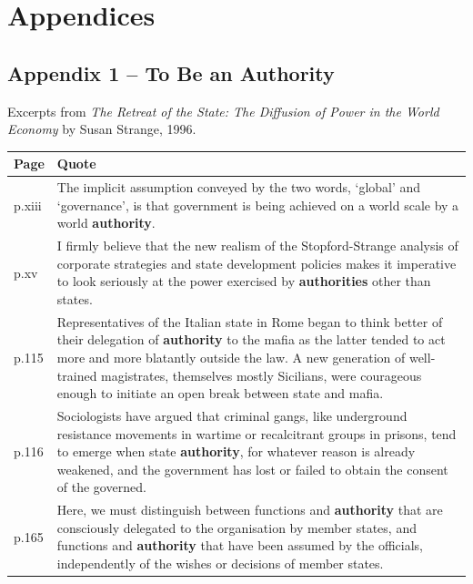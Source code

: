 \chapter*{Appendices}

\section*{Appendix 1 -- To Be an Authority}

Excerpts from \emph{The Retreat of the State: The Diffusion of Power in the World Economy} by Susan Strange, 1996.

\small
\begin{longtable}{p{1.2cm} p{13cm}}
\toprule
\textbf{Page} & \textbf{Quote} \\
\midrule
\endhead

p.xiii & The implicit assumption conveyed by the two words, `global' and `governance', is that government is being achieved on a world scale by a world \textbf{authority}. \\
\midrule

p.xv & I firmly believe that the new realism of the Stopford-Strange analysis of corporate strategies and state development policies makes it imperative to look seriously at the power exercised by \textbf{authorities} other than states. \\
\midrule

p.115 & Representatives of the Italian state in Rome began to think better of their delegation of \textbf{authority} to the mafia as the latter tended to act more and more blatantly outside the law. A new generation of well-trained magistrates, themselves mostly Sicilians, were courageous enough to initiate an open break between state and mafia. \\
\midrule

p.116 & Sociologists have argued that criminal gangs, like underground resistance movements in wartime or recalcitrant groups in prisons, tend to emerge when state \textbf{authority}, for whatever reason is already weakened, and the government has lost or failed to obtain the consent of the governed. \\
\midrule

p.165 & Here, we must distinguish between functions and \textbf{authority} that are consciously delegated to the organisation by member states, and functions and \textbf{authority} that have been assumed by the officials, independently of the wishes or decisions of member states. \\
\midrule


\end{longtable}

